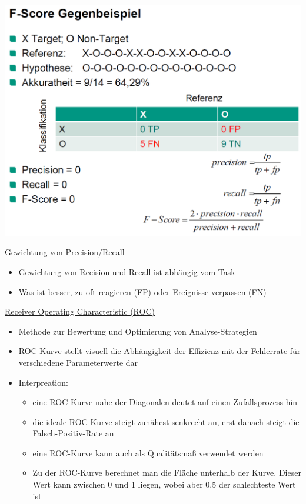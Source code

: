 \documentclass[a4paper,10pt,oneside]{article}
\begin{document}
 \includegraphics[scale=0.2]{Grafiken/2414.png}
 
\underline{Gewichtung von Precision/Recall} \\
 	\begin{itemize}
 		\item Gewichtung von Recision und Recall ist abhängig vom Task
 		\item Was ist besser, zu oft reagieren (FP) oder Ereignisse verpassen (FN)
 	\end{itemize}
 	
\underline{Receiver Operating Characteristic (ROC)} \\
 	\begin{itemize}
 		\item Methode zur Bewertung und Optimierung von Analyse-Strategien
 		\item ROC-Kurve stellt visuell die Abhängigkeit der Effizienz mit der Fehlerrate für verschiedene Parameterwerte dar
 		\item Interpreation:
 			\begin{itemize}
 				\item eine ROC-Kurve nahe der Diagonalen deutet auf einen Zufallsprozess hin
 				\item die ideale ROC-Kurve steigt zunähcst senkrecht an, erst danach steigt die Falsch-Positiv-Rate an
 				\item eine ROC-Kurve kann auch als Qualitätsmaß verwendet werden
 				\item Zu der ROC-Kurve berechnet man die Fläche unterhalb der Kurve. Dieser Wert kann zwischen 0 und 1 liegen, wobei aber 0,5 der schlechteste Wert ist
 			\end{itemize}
 	\end{itemize}
 	
\end{document}
